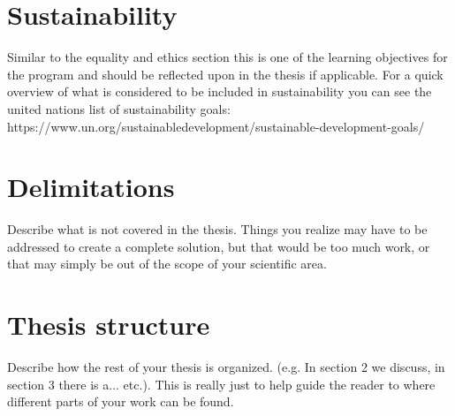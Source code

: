 \section{Sustainability}
Similar to the equality and ethics section this is one of the learning objectives for the program and should be reflected upon in the thesis if applicable. For a quick overview of what is considered to be included in sustainability you can see the united nations list of sustainability goals: https://www.un.org/sustainabledevelopment/sustainable-development-goals/

\section{Delimitations}
Describe what is not covered in the thesis. Things you realize may have to be addressed to create a complete solution, but that would be too much work, or that may simply be out of the scope of your scientific area.

\section{Thesis structure}
Describe how the rest of your thesis is organized. (e.g. In section 2 we discuss, in section 3 there is a... etc.). This is really just to help guide the reader to where different parts of your work can be found.
